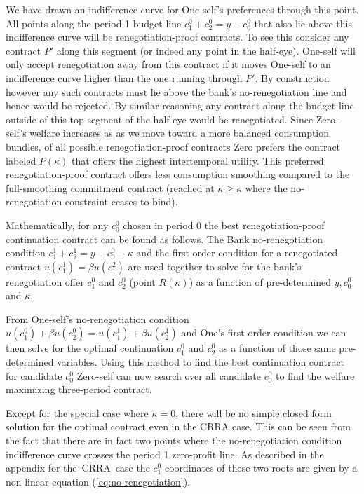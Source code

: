 \documentclass[11pt,english]{article}
\theoremstyle{plain}
\theoremstyle{definition}
\begin{document}
We have drawn an indifference curve for One-self's preferences
through this point. All points along the period 1 budget line $c_{1}^{0}+c_{2}^{0}=y-c_{0}^{0}$
that also lie above this indifference curve will be renegotiation-proof
contracts. To see this consider any contract $P'$ along this segment
(or indeed any point in the half-eye). One-self will only accept renegotiation
away from this contract if it moves One-self to an indifference curve
higher than the one running through $P'$. By construction however
any such contracts must lie above the bank's no-renegotiation line
and hence would be rejected. By similar reasoning any contract along
the budget line outside of this top-segment of the half-eye would
be renegotiated. Since Zero-self's welfare increases as as we move
toward a more balanced consumption bundles, of all possible renegotiation-proof
contracts Zero prefers the contract labeled $P(\kappa)$ that offers
the highest intertemporal utility. This preferred renegotiation-proof
contract offers less consumption smoothing compared to the full-smoothing
commitment contract (reached at $\kappa\ge\bar{\kappa}$ where the
no-renegotiation constraint ceases to bind).

Mathematically, for any $c_{0}^{0}$ chosen in period 0 the
best renegotiation-proof continuation contract can be found as follows.
The Bank no-renegotiation condition $c_{1}^{1}+c_{2}^{1}=y-c_{0}^{0}-\kappa$
and the first order condition for a renegotiated contract $u(c_{1}^{1})=\beta u(c_{1}^{2})$
are used together to solve for the bank's renegotiation offer $c_{1}^{0}$
and $c_{2}^{0}$ (point $R(\kappa)$) as a function of pre-determined
$y,c_{0}^{0}$ and $\kappa$.

From One-self's no-renegotiation condition $u(c_{1}^{0})+\beta u(c_{2}^{0})=u(c_{1}^{1})+\beta u(c_{2}^{1})$
and One's first-order condition we can then solve for the optimal
continuation $c_{1}^{0}$ and $c_{2}^{0}$ as a function of those
same pre-determined variables. Using this method to find the best
continuation contract for candidate $c_{0}^{0}$ Zero-self can now
search over all candidate $c_{0}^{0}$ to find the welfare maximizing
three-period contract.

Except for the special case where $\kappa=0$, there will
be no simple closed form solution for the optimal contract even in
the CRRA case. This can be seen from the fact that there are in fact
two points where the no-renegotiation condition indifference curve
crosses the period 1 zero-profit line. As described in the appendix
for the\ CRRA\ case the $c_{1}^{0}$ coordinates of these two roots
are given by a non-linear equation (\ref{eq:no-renegotiation}).
\end{document}
